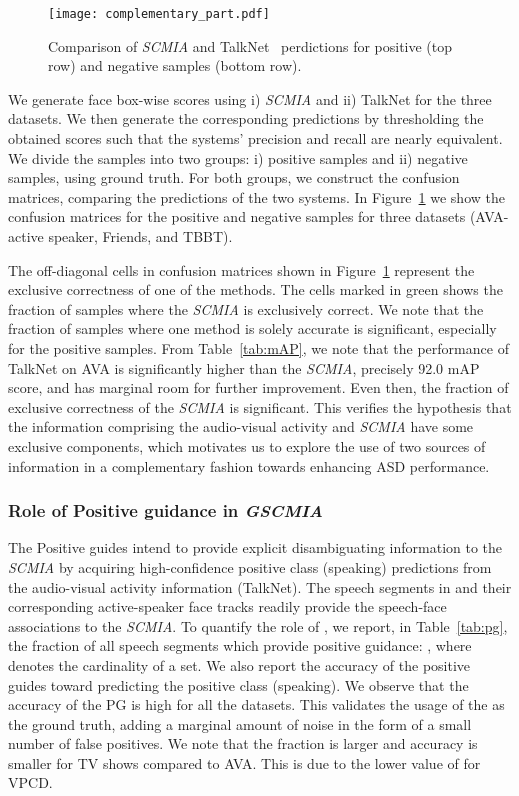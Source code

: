 \begin{figure}[]
    \centering
    \texttt{[image: complementary\_part.pdf]}
    \caption{Comparison of \emph{SCMIA} and TalkNet~\cite{tao2021someone} perdictions for positive (top row) and negative samples (bottom row).} 
    \label{fig:error_analysis}
\end{figure}
We generate face box-wise scores using i) \emph{SCMIA} and ii) TalkNet for the three datasets. We then generate the corresponding predictions by thresholding the obtained scores such that the systems' precision and recall are nearly equivalent. We divide the samples into two groups: i) positive samples and ii) negative samples, using ground truth. For both groups, we construct the confusion matrices, comparing the predictions of the two systems. In Figure~\ref{fig:error_analysis} we show the confusion matrices for the positive and negative samples for three datasets (AVA-active speaker, Friends, and TBBT). 

The off-diagonal cells in confusion matrices shown in Figure~\ref{fig:error_analysis} represent the exclusive correctness of one of the methods. The cells marked in green shows the fraction of samples where the \emph{SCMIA} is exclusively correct. We note that the fraction of samples where one method is solely accurate is significant, especially for the positive samples. From Table~\ref{tab:mAP}, we note that the performance of TalkNet on AVA is significantly higher than the \emph{SCMIA}, precisely 92.0 mAP score, and has marginal room for further improvement. Even then, the fraction of exclusive correctness of the \emph{SCMIA} is significant. 
This verifies the hypothesis that the information comprising the audio-visual activity and \emph{SCMIA} have some exclusive components, which motivates us to explore the use of two sources of information in a complementary fashion towards enhancing ASD performance. 



\subsubsection{Role of Positive guidance  in \emph{GSCMIA}}
The Positive guides intend to provide explicit disambiguating information to the \emph{SCMIA} by acquiring high-confidence positive class (speaking) predictions from the audio-visual activity information (TalkNet). The speech segments in  and their corresponding active-speaker face tracks readily provide the speech-face associations to the \emph{SCMIA}. To quantify the role of , we report, in Table~\ref{tab:pg}, the fraction of all speech segments which provide positive guidance: , where  denotes the cardinality of a set. We also report the accuracy of the positive guides toward predicting the positive class (speaking). We observe that the accuracy of the PG is high for all the datasets. This validates the usage of the  as the ground truth, adding a marginal amount of noise in the form of a small number of false positives. We note that the  fraction is larger and accuracy is smaller for TV shows compared to AVA. This is due to the lower value of  for VPCD.



